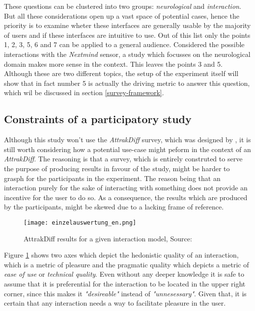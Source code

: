                 These questions can be clustered into two groups: \textit{neurological} and \textit{interaction}. But all these considerations open up a vast space of potential cases, hence the priority is to examine wheter these interfaces are generally usable by the majority of users and if these interfaces are intuitive to use. Out of this list only the points 1, 2, 3, 5, 6 and 7 can be applied to a general audience. Considered the possible interactions with the \textit{Nextmind} sensor, a study which focusses on the neurological domain makes more sense in the context. This leaves the points 3 and 5. Although these are two different topics, the setup of the experiment itself will show that in fact number 5 is actually the driving metric to answer this question, which wil be discussed in section \ref*{survey-framework}.

            \subsection{Constraints of a participatory study}
            
                Although this study won't use the \textit{AttrakDiff} survey, which was designed by \cite{Hassenzahl.30092020}, it is still worth considering how a potential use-case might peform in the context of an \textit{AttrakDiff}. The reasoning is that a survey, which is entirely construted to serve the purpose of producing results in favour of the study, might be harder to grasph for the participants in the experiment. The reason being that an interaction purely for the sake of interacting with something does not provide an incentive for the user to do so. As a consequence, the results which are produced by the participants, might be skewed due to a lacking frame of reference.

                \begin{figure}[h]     %
                    \centering
                    \texttt{[image: einzelauswertung\_en.png]} 
                    \caption{AttrakDiff results for a given interaction model, Source: \cite{Hassenzahl.30092020}}\label{AttrakDiff}
                \end{figure}

                Figure \ref*{AttrakDiff} shows two axes which depict the hedonistic quality of an interaction, which is a metric of pleasure and the pragmatic quality which depicts a metric of \textit{ease of use} or \textit{technical quality}. Even without any deeper knowledge it is safe to assume that it is preferential for the interaction to be located in the upper right corner, since this makes it \textit{"desireable"} instead of \textit{"unnesessary"}. Given that, it is certain that any interaction needs a way to facilitate pleasure in the user.

